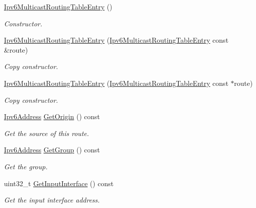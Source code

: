 \begin{DoxyCompactItemize}
\item 
\hyperlink{classns3_1_1Ipv6MulticastRoutingTableEntry_a9e03739078a3a1dcc6e08126e59d6d1b}{Ipv6\+Multicast\+Routing\+Table\+Entry} ()
\begin{DoxyCompactList}\small\item\em Constructor. \end{DoxyCompactList}\item 
\hyperlink{classns3_1_1Ipv6MulticastRoutingTableEntry_a13a9ec36a65e080d6b6bcb309b4bbcb3}{Ipv6\+Multicast\+Routing\+Table\+Entry} (\hyperlink{classns3_1_1Ipv6MulticastRoutingTableEntry}{Ipv6\+Multicast\+Routing\+Table\+Entry} const \&route)
\begin{DoxyCompactList}\small\item\em Copy constructor. \end{DoxyCompactList}\item 
\hyperlink{classns3_1_1Ipv6MulticastRoutingTableEntry_a051c19db586ac0ce4d9e689b49d066c5}{Ipv6\+Multicast\+Routing\+Table\+Entry} (\hyperlink{classns3_1_1Ipv6MulticastRoutingTableEntry}{Ipv6\+Multicast\+Routing\+Table\+Entry} const $\ast$route)
\begin{DoxyCompactList}\small\item\em Copy constructor. \end{DoxyCompactList}\item 
\hyperlink{classns3_1_1Ipv6Address}{Ipv6\+Address} \hyperlink{classns3_1_1Ipv6MulticastRoutingTableEntry_aa30d1a56c0d0d38609ce5daa8b926f41}{Get\+Origin} () const 
\begin{DoxyCompactList}\small\item\em Get the source of this route. \end{DoxyCompactList}\item 
\hyperlink{classns3_1_1Ipv6Address}{Ipv6\+Address} \hyperlink{classns3_1_1Ipv6MulticastRoutingTableEntry_ac3809c68585c66d7034459565edf906d}{Get\+Group} () const 
\begin{DoxyCompactList}\small\item\em Get the group. \end{DoxyCompactList}\item 
uint32\+\_\+t \hyperlink{classns3_1_1Ipv6MulticastRoutingTableEntry_a32003fd1ce03a5a1c8be81f255dbb932}{Get\+Input\+Interface} () const 
\begin{DoxyCompactList}\small\item\em Get the input interface address. \end{DoxyCompactList}\item 

\end{DoxyCompactItemize}
